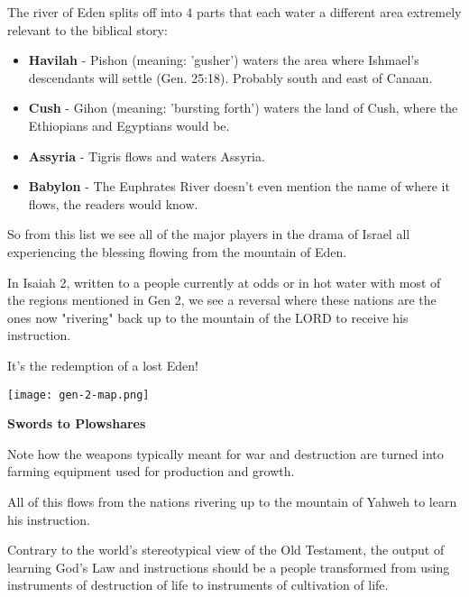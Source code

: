 \documentclass[11pt]{article}
\begin{document}
The river of Eden splits off into 4 parts that each water a different area extremely relevant to the biblical story:
\begin{itemize}
    \item \textbf{Havilah} - Pishon (meaning: 'gusher') waters the area where Ishmael's descendants will settle (Gen. 25:18). Probably south and east of Canaan.
    \item \textbf{Cush} - Gihon (meaning: 'bursting forth') waters the land of Cush, where the Ethiopians and Egyptians would be.
    \item \textbf{Assyria} - Tigris flows and waters Assyria.
    \item \textbf{Babylon} - The Euphrates River doesn't even mention the name of where it flows, the readers would know.
\end{itemize}

So from this list we see all of the major players in the drama of Israel all experiencing the blessing flowing from the mountain of Eden.

In Isaiah 2, written to a people currently at odds or in hot water with most of the regions mentioned in Gen 2, we see a reversal where these nations are the ones
now "rivering" back up to the mountain of the LORD to receive his instruction.

It's the redemption of a lost Eden!

\vspace{1em}
\begin{center}
\texttt{[image: gen-2-map.png]}
\end{center}
\vspace{1em}

\vspace{7em}
{\large\bfseries Swords to Plowshares}
\vspace{1em}

Note how the weapons typically meant for war and destruction are turned into farming equipment
used for production and growth.

All of this flows from the nations rivering up to the mountain of Yahweh to learn his instruction.

{\vspace{1em}}

Contrary to the world's stereotypical view of the Old Testament, the output of learning God's Law and instructions
should be a people transformed from using instruments of destruction of life to instruments of cultivation of life.
\end{document}
